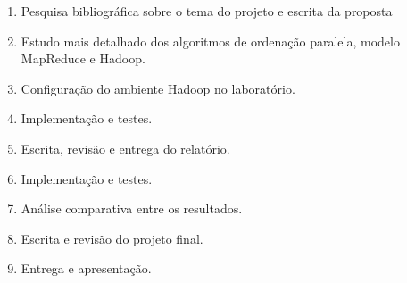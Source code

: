 \begin{enumerate}
 \item \label{c1} Pesquisa bibliográfica sobre o tema do projeto e escrita da proposta
 \item \label{c2} Estudo mais detalhado dos algoritmos de ordenação paralela,  modelo MapReduce e Hadoop.
 \item \label{c3} Configuração do ambiente Hadoop no laboratório.
 \item \label{c4} Implementação e testes.
 \item \label{c5} Escrita, revisão e entrega do relatório. 
 \item \label{c6} Implementação e testes.
 \item \label{c7} Análise comparativa entre os resultados.
 \item \label{c8} Escrita e revisão do projeto final.
 \item \label{c9} Entrega e apresentação.
 \end{enumerate}
 
%
